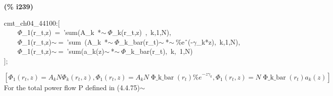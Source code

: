 \documentclass[fleqn]{article}
\begin{document}
\noindent
\begin{minipage}[t]{4.000000em}\color{red}\bfseries
(\% i239)	
\end{minipage}
\begin{minipage}[t]{\textwidth}\color{blue}
cmt\_ch04\_44100:[\\
\ \ \ \ \ensuremath{\Phi}\_1(r\_t,z)\ =\ 'sum(A\_k\ *\ensuremath{\sim\ }\ensuremath{\Phi}\_k(r\_t,z)\ ,\ k,1,N),\ \ \\
\ \ \ \ \ensuremath{\Phi}\_1(r\_t,z)\ensuremath{\sim\ }=\ 'sum\ (A\_k\ *\ensuremath{\sim\ }\ensuremath{\Phi}\_k\_bar(r\_t)\ensuremath{\sim\ }*\ensuremath{\sim\ }\%e\^\ (-\ensuremath{\gamma}\_k*z),\ k,1,N),\\
\ \ \ \ \ensuremath{\Phi}\_1(r\_t,z)\ensuremath{\sim\ }=\ 'sum(a\_k(z)\ensuremath{\sim\ }*\ensuremath{\sim\ }\ensuremath{\Phi}\_k\_bar(r\_t),\ k,\ 1,N)\\
];
\end{minipage}
\[\displaystyle \tag{\% o239} 
\left[ {{\Phi }_1}\left( {r_t}\operatorname{,}z\right) ={A_k} N {{\Phi }_k}\left( {r_t}\operatorname{,}z\right) \operatorname{,}{{\Phi }_1}\left( {r_t}\operatorname{,}z\right) ={A_k} N \operatorname{\Phi \_ k\_ bar}\left( {r_t}\right)  {{\% e}^{-z {{\gamma }_k}}}\operatorname{,}{{\Phi }_1}\left( {r_t}\operatorname{,}z\right) =N \operatorname{\Phi \_ k\_ bar}\left( {r_t}\right)  {a_k}(z)\right] \mbox{}
\]
For the total power flow P defined in (4.4.75)\ensuremath{\sim }
\end{document}
